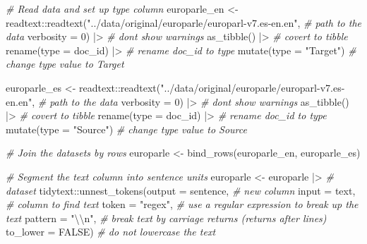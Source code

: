 \documentclass[
  letterpaper,
]{scrbook}
\newenvironment{Shaded}{\begin{snugshade}}{\end{snugshade}}
\newcommand{\AttributeTok}[1]{\textcolor[rgb]{0.00,0.00,0.00}{#1}}
\newcommand{\CommentTok}[1]{\textcolor[rgb]{0.00,0.00,0.00}{\textit{#1}}}
\newcommand{\ConstantTok}[1]{\textcolor[rgb]{0.00,0.00,0.00}{#1}}
\newcommand{\DecValTok}[1]{\textcolor[rgb]{0.00,0.00,0.00}{#1}}
\newcommand{\FunctionTok}[1]{\textcolor[rgb]{0.00,0.00,0.00}{#1}}
\newcommand{\NormalTok}[1]{\textcolor[rgb]{0.00,0.00,0.00}{#1}}
\newcommand{\OtherTok}[1]{\textcolor[rgb]{0.00,0.00,0.00}{#1}}
\newcommand{\SpecialCharTok}[1]{\textcolor[rgb]{0.00,0.00,0.00}{#1}}
\newcommand{\StringTok}[1]{\textcolor[rgb]{0.00,0.00,0.00}{#1}}
\begin{document}
\begin{Shaded}
\begin{Highlighting}[]
\CommentTok{\# Read data and set up \textasciigrave{}type\textasciigrave{} column}
\NormalTok{europarle\_en }\OtherTok{\textless{}{-}}  
\NormalTok{  readtext}\SpecialCharTok{::}\FunctionTok{readtext}\NormalTok{(}\StringTok{"../data/original/europarle/europarl{-}v7.es{-}en.en"}\NormalTok{, }\CommentTok{\# path to the data}
                     \AttributeTok{verbosity =} \DecValTok{0}\NormalTok{) }\SpecialCharTok{|\textgreater{}} \CommentTok{\# don\textquotesingle{}t show warnings}
  \FunctionTok{as\_tibble}\NormalTok{() }\SpecialCharTok{|\textgreater{}} \CommentTok{\# covert to tibble}
  \FunctionTok{rename}\NormalTok{(}\AttributeTok{type =}\NormalTok{ doc\_id) }\SpecialCharTok{|\textgreater{}} \CommentTok{\# rename doc\_id to type}
  \FunctionTok{mutate}\NormalTok{(}\AttributeTok{type =} \StringTok{"Target"}\NormalTok{) }\CommentTok{\# change type value to \textquotesingle{}Target\textquotesingle{}}

\NormalTok{europarle\_es }\OtherTok{\textless{}{-}} 
\NormalTok{  readtext}\SpecialCharTok{::}\FunctionTok{readtext}\NormalTok{(}\StringTok{"../data/original/europarle/europarl{-}v7.es{-}en.en"}\NormalTok{, }\CommentTok{\# path to the data}
                     \AttributeTok{verbosity =} \DecValTok{0}\NormalTok{) }\SpecialCharTok{|\textgreater{}}  \CommentTok{\# don\textquotesingle{}t show warnings}
  \FunctionTok{as\_tibble}\NormalTok{() }\SpecialCharTok{|\textgreater{}} \CommentTok{\# covert to tibble}
  \FunctionTok{rename}\NormalTok{(}\AttributeTok{type =}\NormalTok{ doc\_id) }\SpecialCharTok{|\textgreater{}} \CommentTok{\# rename doc\_id to type}
  \FunctionTok{mutate}\NormalTok{(}\AttributeTok{type =} \StringTok{"Source"}\NormalTok{) }\CommentTok{\# change type value to \textquotesingle{}Source\textquotesingle{}}

\CommentTok{\# Join the datasets by rows}
\NormalTok{europarle }\OtherTok{\textless{}{-}} 
  \FunctionTok{bind\_rows}\NormalTok{(europarle\_en, europarle\_es)}

\CommentTok{\# Segment the \textasciigrave{}text\textasciigrave{} column into \textasciigrave{}sentence\textasciigrave{} units}
\NormalTok{europarle }\OtherTok{\textless{}{-}} 
\NormalTok{  europarle }\SpecialCharTok{|\textgreater{}} \CommentTok{\# dataset}
\NormalTok{  tidytext}\SpecialCharTok{::}\FunctionTok{unnest\_tokens}\NormalTok{(}\AttributeTok{output =}\NormalTok{ sentence, }\CommentTok{\# new column}
                          \AttributeTok{input =}\NormalTok{ text, }\CommentTok{\# column to find text}
                          \AttributeTok{token =} \StringTok{"regex"}\NormalTok{, }\CommentTok{\# use a regular expression to break up the text}
                          \AttributeTok{pattern =} \StringTok{"}\SpecialCharTok{\textbackslash{}\textbackslash{}}\StringTok{n"}\NormalTok{, }\CommentTok{\# break text by carriage returns (returns after lines)}
                          \AttributeTok{to\_lower =} \ConstantTok{FALSE}\NormalTok{) }\CommentTok{\# do not lowercase the text}


\end{Highlighting}
\end{Shaded}
\end{document}

